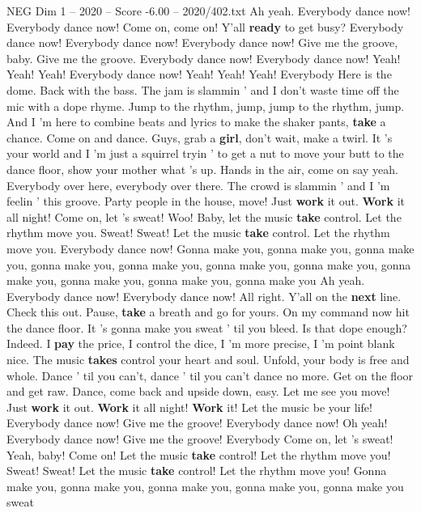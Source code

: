 \begin{textsample}{NEG Dim 1 – 2020 – Score -6.00 – 2020/402.txt}  \label{ex:f1_neg_038}
Ah yeah.
Everybody dance now!
Everybody dance now!
Come on, come on!
Y'all \textbf{ready} to get busy?
Everybody dance now!
Everybody dance now!
Everybody dance now!
Give me the groove, baby.
Give me the groove.
Everybody dance now!
Everybody dance now!
Yeah!
Yeah!
Yeah!
Everybody dance now!
Yeah!
Yeah!
Yeah!
Everybody Here is the dome.
Back with the bass.
The jam is slammin ' and I don't waste time off the mic with a dope rhyme.
Jump to the rhythm, jump, jump to the rhythm, jump.
And I 'm here to combine beats and lyrics to make the shaker pants, \textbf{take} a chance.
Come on and dance.
Guys, grab a \textbf{girl}, don't wait, make a twirl.
It 's your world and I 'm just a squirrel tryin ' to get a nut to move your butt to the dance floor, show your mother what 's up.
Hands in the air, come on say yeah.
Everybody over here, everybody over there.
The crowd is slammin ' and I 'm feelin ' this groove.
Party people in the house, move!
Just \textbf{work} it out. \textbf{Work} it all night!
Come on, let 's sweat!
Woo!
Baby, let the music \textbf{take} control.
Let the rhythm move you.
Sweat!
Sweat!
Let the music \textbf{take} control.
Let the rhythm move you.
Everybody dance now!
Gonna make you, gonna make you, gonna make you, gonna make you, gonna make you, gonna make you, gonna make you, gonna make you, gonna make you, gonna make you, gonna make you Ah yeah.
Everybody dance now!
Everybody dance now!
All right.
Y'all on the \textbf{next} line.
Check this out.
Pause, \textbf{take} a breath and go for yours.
On my command now hit the dance floor.
It 's gonna make you sweat ' til you bleed.
Is that dope enough?
Indeed.
I \textbf{pay} the price, I control the dice, I 'm more precise, I 'm point blank nice.
The music \textbf{takes} control your heart and soul.
Unfold, your body is free and whole.
Dance ' til you can't, dance ' til you can't dance no more.
Get on the floor and get raw.
Dance, come back and upside down, easy.
Let me see you move!
Just \textbf{work} it out. \textbf{Work} it all night! \textbf{Work} it!
Let the music be your life!
Everybody dance now!
Give me the groove!
Everybody dance now!
Oh yeah!
Everybody dance now!
Give me the groove!
Everybody Come on, let 's sweat!
Yeah, baby!
Come on!
Let the music \textbf{take} control!
Let the rhythm move you!
Sweat!
Sweat!
Let the music \textbf{take} control!
Let the rhythm move you!
Gonna make you, gonna make you, gonna make you, gonna make you, gonna make you sweat

\end{textsample}
